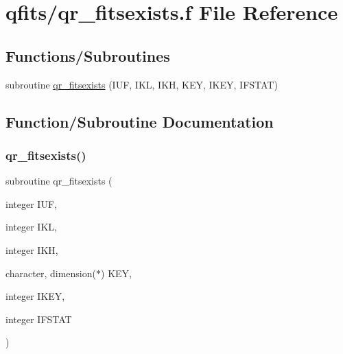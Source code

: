\hypertarget{qr__fitsexists_8f}{}\section{qfits/qr\+\_\+fitsexists.f File Reference}
\label{qr__fitsexists_8f}
\subsection*{Functions/\+Subroutines}
\begin{DoxyCompactItemize}
\item 
subroutine \hyperlink{qr__fitsexists_8f_aad74682b00c0df7e9212b1d108fd67f3}{qr\+\_\+fitsexists} (I\+UF, I\+KL, I\+KH, K\+EY, I\+K\+EY, I\+F\+S\+T\+AT)
\end{DoxyCompactItemize}


\subsection{Function/\+Subroutine Documentation}
\mbox{\label{qr__fitsexists_8f_aad74682b00c0df7e9212b1d108fd67f3}} 
\subsubsection{\texorpdfstring{qr\+\_\+fitsexists()}{qr\_fitsexists()}}
{\footnotesize\ttfamily subroutine qr\+\_\+fitsexists (\begin{DoxyParamCaption}\item[{integer}]{I\+UF,  }\item[{integer}]{I\+KL,  }\item[{integer}]{I\+KH,  }\item[{character, dimension($\ast$)}]{K\+EY,  }\item[{integer}]{I\+K\+EY,  }\item[{integer}]{I\+F\+S\+T\+AT }\end{DoxyParamCaption})}

